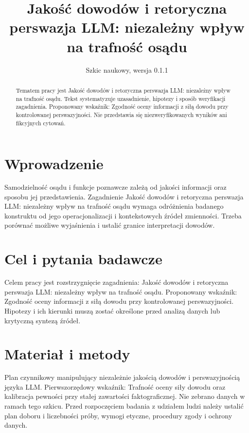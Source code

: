 \documentclass[11pt,a4paper]{article}
\title{Jakość dowodów i retoryczna perswazja LLM: niezależny wpływ na trafność osądu}
\author{}
\date{Szkic naukowy, wersja 0.1.1}
\begin{document}
\maketitle

\begin{abstract}

Tematem pracy jest Jakość dowodów i retoryczna perswazja LLM: niezależny wpływ na trafność osądu. Tekst systematyzuje uzasadnienie, hipotezy i sposób weryfikacji zagadnienia. Proponowany wskaźnik: Zgodność oceny informacji z siłą dowodu przy kontrolowanej perswazyjności. Nie przedstawia się niezweryfikowanych wyników ani fikcyjnych cytowań.

\end{abstract}

\section{Wprowadzenie}

Samodzielność osądu i funkcje poznawcze zależą od jakości informacji oraz sposobu jej przedstawienia. Zagadnienie Jakość dowodów i retoryczna perswazja LLM: niezależny wpływ na trafność osądu wymaga odróżnienia badanego konstruktu od jego operacjonalizacji i kontekstowych źródeł zmienności. Trzeba porównać możliwe wyjaśnienia i ustalić granice interpretacji dowodów.

\section{Cel i pytania badawcze}

Celem pracy jest rozstrzygnięcie zagadnienia: Jakość dowodów i retoryczna perswazja LLM: niezależny wpływ na trafność osądu. Proponowany wskaźnik: Zgodność oceny informacji z siłą dowodu przy kontrolowanej perswazyjności. Hipotezy i ich kierunki muszą zostać określone przed analizą danych lub krytyczną syntezą źródeł.

\section{Materiał i metody}

Plan czynnikowy manipulujący niezależnie jakością dowodów i perswazyjnością języka LLM. Pierwszorzędowy wskaźnik: Trafność oceny siły dowodu oraz kalibracja pewności przy stałej zawartości faktograficznej. Nie zebrano danych w ramach tego szkicu. Przed rozpoczęciem badania z udziałem ludzi należy ustalić plan doboru i liczebności próby, wymogi etyczne, procedury zgody i ochrony danych.
\end{document}
